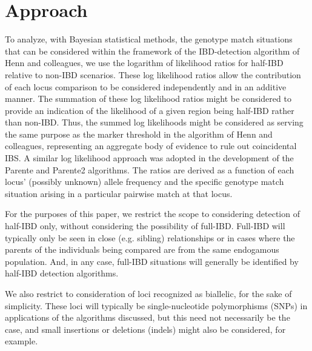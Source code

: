 \documentclass{article}
\begin{document}
\section{Approach}
To analyze, with Bayesian statistical methods, the genotype match situations that can be considered within the framework of the IBD-detection algorithm of Henn and colleagues, we use the logarithm of likelihood ratios for half-IBD relative to non-IBD scenarios. These log likelihood ratios allow the contribution of each locus comparison to be considered independently and in an additive manner. The summation of these log likelihood ratios might be considered to provide an indication of the likelihood of a given region being half-IBD rather than non-IBD. Thus, the summed log likelihoods might be considered as serving the same purpose as the marker threshold in the algorithm of Henn and colleagues, representing an aggregate body of evidence to rule out coincidental IBS. A similar log likelihood approach was adopted in the development of the Parente and Parente2 algorithms.\citep{Parente} \citep{Parente2} The ratios are derived as a function of each locus' (possibly unknown) allele frequency and the specific genotype match situation arising in a particular pairwise match at that locus.

For the purposes of this paper, we restrict the scope to considering detection of half-IBD only, without considering the possibility of full-IBD. Full-IBD will typically only be seen in close (e.g. sibling) relationships or in cases where the parents of the individuals being compared are from the same endogamous population. And, in any case, full-IBD situations will generally be identified by half-IBD detection algorithms.

We also restrict to consideration of loci recognized as biallelic, for the sake of simplicity. These loci will typically be single-nucleotide polymorphisms (SNPs) in applications of the algorithms discussed, but this need not necessarily be the case, and small insertions or deletions (indels) might also be considered, for example.
\end{document}

